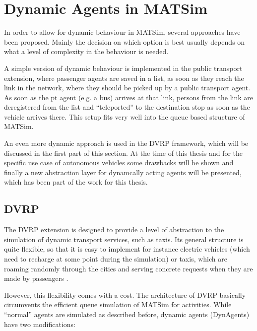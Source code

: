 \section{Dynamic Agents in MATSim}
\label{sec:dynagent}

In order to allow for dynamic behaviour in MATSim, several approaches have been
proposed. Mainly the decision on which option is best usually depends on what a
level of complexity in the behaviour is needed.

A simple version of dynamic behaviour is implemented in the public transport
extension, where passenger agents are saved in a list, as soon as they reach the
link in the network, where they should be picked up by a public transport agent.
As soon as the pt agent (e.g. a bus) arrives at that link, persons from the link
are deregistered from the list and ``teleported'' to the destination stop as soon
as the vehicle arrives there. This setup fits very well into the queue based structure
of MATSim.

An even more dynamic approach is used in the DVRP framework, which will be discussed
in the first part of this section. At the time of this thesis and for the specific
use case of autonomous vehicles some drawbacks will be shown and finally a new
abstraction layer for dynamcally acting agents will be presented, which has been
part of the work for this thesis.

\subsection{DVRP}

The DVRP extension  is designed to provide a level of abstraction to the simulation of
dynamic transport services, such as taxis. Its general structure is quite flexible,
so that it is easy to implement for instance electric vehicles  (which need to recharge
at some point during the simulation) or taxis, which are roaming randomly through
the cities and serving concrete requests when they are made by passengers .

However, this flexibility comes with a cost. The architecture of DVRP basically
circumvents the efficient queue simulation of MATSim for activities. While ``normal''
agents are simulated as described before, dynamic agents (DynAgents) have two
modifications:

